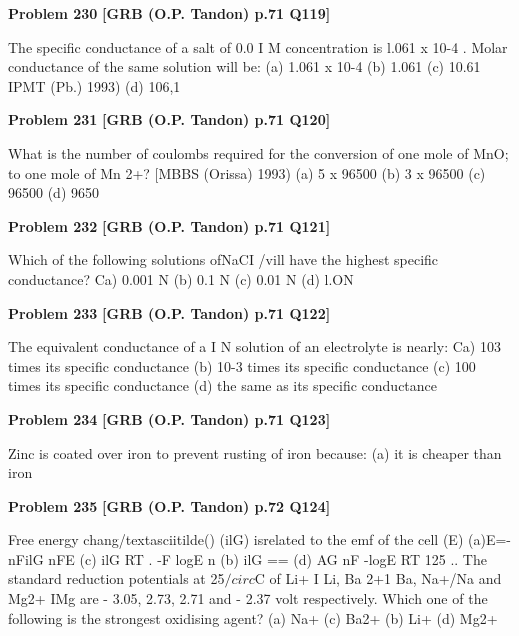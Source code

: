 \begin{problembox}
\textbf{Problem 230} \hfill \textbf{[GRB (O.P. Tandon) p.71 Q119]}
\label{q:ext-grb_all_questions-230}

The specific conductance of a salt of 0.0 I M concentration is 
l.061 x 10-4 . Molar conductance of the same solution will be: 
(a) 1.061 x 10-4 (b) 1.061 
(c) 10.61 
IPMT (Pb.) 1993) 
(d) 106,1
\end{problembox}

\begin{problembox}
\textbf{Problem 231} \hfill \textbf{[GRB (O.P. Tandon) p.71 Q120]}
\label{q:ext-grb_all_questions-231}

What is the number of coulombs required for the conversion 
of one mole of MnO; to one mole of Mn 2+? 
[MBBS (Orissa) 1993) 
(a) 5 x 96500 (b) 3 x 96500 (c) 96500 
(d) 9650
\end{problembox}

\begin{problembox}
\textbf{Problem 232} \hfill \textbf{[GRB (O.P. Tandon) p.71 Q121]}
\label{q:ext-grb_all_questions-232}

Which of the following solutions ofNaCI /vill have the highest 
specific conductance? 
Ca) 0.001 N 
(b) 0.1 N 
(c) 0.01 N 
(d) l.ON
\end{problembox}

\begin{problembox}
\textbf{Problem 233} \hfill \textbf{[GRB (O.P. Tandon) p.71 Q122]}
\label{q:ext-grb_all_questions-233}

The equivalent conductance of a I N solution of an electrolyte 
is nearly: 
Ca) 103 times its specific conductance 
(b) 10-3 times its specific conductance 
(c) 100 times its specific conductance 
(d) the same as its specific conductance
\end{problembox}

\begin{problembox}
\textbf{Problem 234} \hfill \textbf{[GRB (O.P. Tandon) p.71 Q123]}
\label{q:ext-grb_all_questions-234}

Zinc is coated over iron to prevent rusting of iron because: 
(a) it is cheaper than iron
\end{problembox}

\begin{problembox}
\textbf{Problem 235} \hfill \textbf{[GRB (O.P. Tandon) p.72 Q124]}
\label{q:ext-grb_all_questions-235}

Free energy chang/textasciitilde() (ilG) isrelated to the emf of the cell (E) 
(a)E=-nFilG 
nFE 
(c) ilG 
RT . 
-F logE 
n 
(b) ilG == 
(d) AG 
nF 
-logE 
RT 
125 .. The standard reduction potentials at 25$/circ$C of Li+ I Li, 
Ba 2+1 Ba, Na+/Na and Mg2+ IMg are - 3.05, 
2.73, 
2.71 
and - 2.37 volt respectively. Which one of the following is the 
strongest oxidising agent? 
(a) Na+ 
(c) Ba2+ 
(b) Li+ 
(d) Mg2+
\end{problembox}

